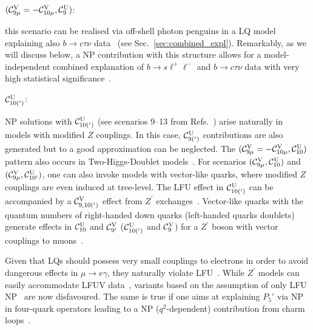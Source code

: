 \documentclass[10pt]{article}
\begin{document}
{\begin{boldmath} $(\mathcal{C}_{9\mu}^{\rm V}=-\mathcal{C}_{10\mu}^{\rm V},\mathcal{C}_{9}^{\rm U})$: \end{boldmath}} this scenario can be realised via off-shell photon penguins in a LQ model explaining also $b\to c\tau\nu$ data~\cite{Crivellin:2018yvo} (see Sec.~\ref{sec:combined_expl}). Remarkably, as we will discuss below, a NP contribution with this structure allows for a model-independent combined explanation of $b\to s\ell^+\ell^-$ and $b\to c\tau\nu$ data with very high statistical significance~\cite{Crivellin:2018yvo,Alguero:2019ptt,Alguero:2021anc}.

{\begin{boldmath} $\mathcal{C}_{10(')}^{\rm U}$: \end{boldmath}} NP solutions with $\mathcal{C}_{10(')}^{\rm U}$ (see scenarios 9--13 from Refs.~\cite{Alguero:2019ptt,Alguero:2021anc}) arise naturally in models with modified $Z$ couplings. In this case, $\mathcal{C}_{9(')}^{\rm U}$ contributions are also generated but to a good approximation can be neglected. The $(\mathcal{C}_{9\mu}^{\rm V}=-\mathcal{C}_{10\mu}^{\rm V},\mathcal{C}_{10}^{\rm U})$ pattern also occurs in Two-Higgs-Doublet models~\cite{Crivellin:2019dun}. For scenarios $(\mathcal{C}_{9\mu}^{\rm V},\mathcal{C}_{10}^{\rm U})$ and $(\mathcal{C}_{9\mu}^{\rm V},\mathcal{C}_{10'}^{\rm U})$, one can also invoke models with vector-like quarks, where modified $Z$ couplings are even induced at tree-level. The LFU effect in $\mathcal{C}_{10(')}^{\rm U}$ can be accompanied by a $\mathcal{C}_{9,10(')}^{\rm V}$ effect from $Z^\prime$ exchanges~\cite{Bobeth:2016llm}. Vector-like quarks with the quantum numbers of right-handed down quarks (left-handed quarks doublets) generate effects in $\mathcal{C}_{10}^{\rm U}$ and $\mathcal{C}_{9'}^{\rm V}$ ($\mathcal{C}_{10(')}^{\rm U}$ and $\mathcal{C}_{9}^{\rm V}$) for a $Z^\prime$ boson with vector couplings to muons~\cite{Bobeth:2016llm}.

Given that LQs should possess very small couplings to electrons in order to avoid dangerous effects in $\mu\to e\gamma$, they naturally violate LFU~\cite{Crivellin:2017dsk}. While $Z^\prime$ models can easily accommodate LFUV data~\cite{Falkowski:2015zwa}, variants based on the assumption of only LFU NP~\cite{Gauld:2013qba,Buras:2013dea} are now disfavoured. The same is true if one aims at explaining $P_5'$ via NP in four-quark operators leading to a NP ($q^2$-dependent) contribution from charm loops~\cite{Jager:2017gal}.
\end{document}
